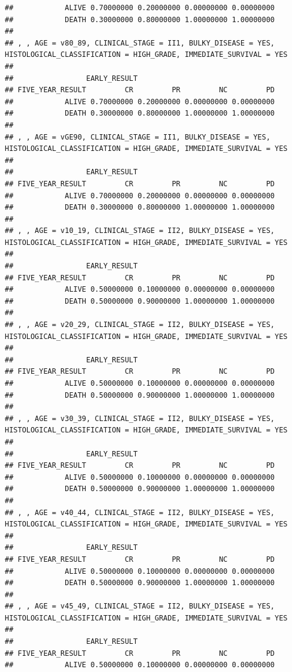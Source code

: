 \documentclass[]{article}
\begin{document}
\begin{verbatim}
##            ALIVE 0.70000000 0.20000000 0.00000000 0.00000000
##            DEATH 0.30000000 0.80000000 1.00000000 1.00000000
## 
## , , AGE = v80_89, CLINICAL_STAGE = II1, BULKY_DISEASE = YES, HISTOLOGICAL_CLASSIFICATION = HIGH_GRADE, IMMEDIATE_SURVIVAL = YES
## 
##                 EARLY_RESULT
## FIVE_YEAR_RESULT         CR         PR         NC         PD
##            ALIVE 0.70000000 0.20000000 0.00000000 0.00000000
##            DEATH 0.30000000 0.80000000 1.00000000 1.00000000
## 
## , , AGE = vGE90, CLINICAL_STAGE = II1, BULKY_DISEASE = YES, HISTOLOGICAL_CLASSIFICATION = HIGH_GRADE, IMMEDIATE_SURVIVAL = YES
## 
##                 EARLY_RESULT
## FIVE_YEAR_RESULT         CR         PR         NC         PD
##            ALIVE 0.70000000 0.20000000 0.00000000 0.00000000
##            DEATH 0.30000000 0.80000000 1.00000000 1.00000000
## 
## , , AGE = v10_19, CLINICAL_STAGE = II2, BULKY_DISEASE = YES, HISTOLOGICAL_CLASSIFICATION = HIGH_GRADE, IMMEDIATE_SURVIVAL = YES
## 
##                 EARLY_RESULT
## FIVE_YEAR_RESULT         CR         PR         NC         PD
##            ALIVE 0.50000000 0.10000000 0.00000000 0.00000000
##            DEATH 0.50000000 0.90000000 1.00000000 1.00000000
## 
## , , AGE = v20_29, CLINICAL_STAGE = II2, BULKY_DISEASE = YES, HISTOLOGICAL_CLASSIFICATION = HIGH_GRADE, IMMEDIATE_SURVIVAL = YES
## 
##                 EARLY_RESULT
## FIVE_YEAR_RESULT         CR         PR         NC         PD
##            ALIVE 0.50000000 0.10000000 0.00000000 0.00000000
##            DEATH 0.50000000 0.90000000 1.00000000 1.00000000
## 
## , , AGE = v30_39, CLINICAL_STAGE = II2, BULKY_DISEASE = YES, HISTOLOGICAL_CLASSIFICATION = HIGH_GRADE, IMMEDIATE_SURVIVAL = YES
## 
##                 EARLY_RESULT
## FIVE_YEAR_RESULT         CR         PR         NC         PD
##            ALIVE 0.50000000 0.10000000 0.00000000 0.00000000
##            DEATH 0.50000000 0.90000000 1.00000000 1.00000000
## 
## , , AGE = v40_44, CLINICAL_STAGE = II2, BULKY_DISEASE = YES, HISTOLOGICAL_CLASSIFICATION = HIGH_GRADE, IMMEDIATE_SURVIVAL = YES
## 
##                 EARLY_RESULT
## FIVE_YEAR_RESULT         CR         PR         NC         PD
##            ALIVE 0.50000000 0.10000000 0.00000000 0.00000000
##            DEATH 0.50000000 0.90000000 1.00000000 1.00000000
## 
## , , AGE = v45_49, CLINICAL_STAGE = II2, BULKY_DISEASE = YES, HISTOLOGICAL_CLASSIFICATION = HIGH_GRADE, IMMEDIATE_SURVIVAL = YES
## 
##                 EARLY_RESULT
## FIVE_YEAR_RESULT         CR         PR         NC         PD
##            ALIVE 0.50000000 0.10000000 0.00000000 0.00000000

\end{verbatim}
\end{document}
